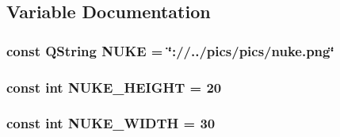\subsection{Variable Documentation}
\hypertarget{nukeactor_8hh_a533b7f84d79dc6971f2d2b7db8c9206e}{
\subsubsection[{N\-U\-K\-E}]{\setlength{\rightskip}{0pt plus 5cm}const Q\-String N\-U\-K\-E = \char`\"{}\-://../pics/pics/nuke.\-png\char`\"{}}}\label{nukeactor_8hh_a533b7f84d79dc6971f2d2b7db8c9206e}
\hypertarget{nukeactor_8hh_aa87a4f879db9b0096ae5c8b47973368c}{
\subsubsection[{N\-U\-K\-E\-\_\-\-H\-E\-I\-G\-H\-T}]{\setlength{\rightskip}{0pt plus 5cm}const int N\-U\-K\-E\-\_\-\-H\-E\-I\-G\-H\-T = 20}}\label{nukeactor_8hh_aa87a4f879db9b0096ae5c8b47973368c}
\hypertarget{nukeactor_8hh_a86069c9a9259fea726afb281654acb9c}{
\subsubsection[{N\-U\-K\-E\-\_\-\-W\-I\-D\-T\-H}]{\setlength{\rightskip}{0pt plus 5cm}const int N\-U\-K\-E\-\_\-\-W\-I\-D\-T\-H = 30}}\label{nukeactor_8hh_a86069c9a9259fea726afb281654acb9c}
